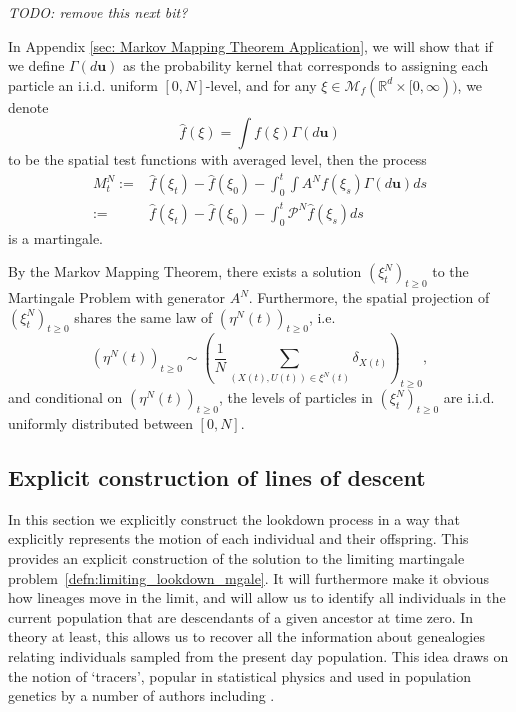 \documentclass[12pt]{article}
\def \hat{\widehat}
\newcommand{\IR}{\mathbb R}
\newcommand{\Pgen}{\mathcal{P}}    %
\newcommand{\lp}{\xi}              %
\newcommand{\comment}[1]{{\color{blue} \it #1}}
\begin{document}
\comment{TODO: remove this next bit?}

In Appendix \ref{sec: Markov Mapping Theorem Application},
we will show that
if we define $\Gamma (d\textbf{u})$
as the probability kernel that corresponds to
assigning each particle an i.i.d. uniform $[0,N]$-level,
and for any $\lp \in \mathcal{M}_f(\IR^d \times [0,\infty))$, we denote
$$\hat{f}(\lp)=\int f(\lp) \Gamma (d\textbf{u})$$ 
to be the spatial test functions with averaged level,
then the process
\begin{equation}
\begin{aligned}
M^{N}_t:=&\hat{f}(\lp_t)-\hat{f}(\lp_0)-\int_{0}^{t}\int   A^{N}f(\lp_s)\Gamma(d\textbf{u})ds\\
:=&\hat{f}(\lp_t)-\hat{f}(\lp_0)-\int_{0}^{t}   \Pgen^{N}\hat{f}(\lp_s)ds
\end{aligned}    
\end{equation}
is a martingale.

By the Markov Mapping Theorem,
there exists a solution $(\lp^{N}_t)_{t \geq 0}$
to the Martingale Problem with generator $A^{N}$.
Furthermore,
the spatial projection of $(\lp^{N}_t)_{t \geq 0}$
shares the same law of $(\eta^{N}(t))_{t \geq 0}$,
i.e.
$$(\eta^{N}(t))_{t \geq 0}
\sim \left(\frac{1}{N}\sum\limits_{(X(t),U(t))\in \lp^{N}(t)} \delta_{X(t)}\right)_{t \geq 0},$$
and conditional on 
$(\eta^{N}(t))_{t \geq 0}$,
the levels of particles in $(\lp^{N}_t)_{t \geq 0}$
are i.i.d. uniformly distributed between $[0,N]$.


\subsection{Explicit construction of lines of descent}
    \label{sec: individual lines of descent}

In this section we explicitly construct the lookdown process
in a way that explicitly represents the motion of each individual and their offspring.
This provides an explicit construction of the solution to
the limiting martingale problem~\ref{defn:limiting_lookdown_mgale}.
It will furthermore make it obvious how lineages move in the limit,
and will allow us to identify all 
individuals in the current population that are descendants of a
given ancestor at time zero. In theory at least, this allows us to
recover all the information about genealogies relating individuals 
sampled from the present day population. This idea draws on the notion
of `tracers', popular in statistical physics and used in population
genetics by a number of authors including 
\cite{biswas/etheridge/klimek:2018, durrett/fan:2016, hallatschek/nelson:2008}.
\end{document}
